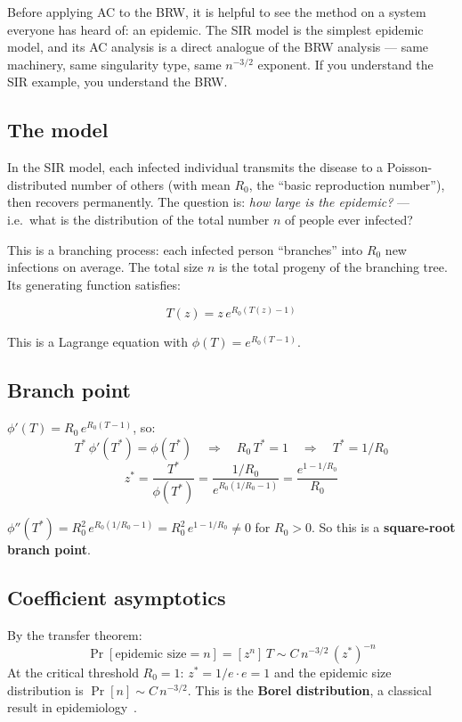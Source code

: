 \documentclass[11pt,a4paper]{article}
\theoremstyle{definition}
\begin{document}
Before applying AC to the BRW, it is helpful to see the method on
a system everyone has heard of: an epidemic. The SIR model is the
simplest epidemic model, and its AC analysis is a direct analogue of
the BRW analysis --- same machinery, same singularity type, same
$n^{-3/2}$ exponent. If you understand the SIR example, you understand
the BRW.

\subsection{The model}

In the SIR model, each infected individual transmits the disease to
a Poisson-distributed number of others (with mean $R_0$, the ``basic
reproduction number''), then recovers permanently. The question is:
\emph{how large is the epidemic?} --- i.e.\ what is the distribution
of the total number $n$ of people ever infected?

This is a branching process: each infected person ``branches'' into
$R_0$ new infections on average. The total size $n$ is the total
progeny of the branching tree. Its generating function satisfies:

\begin{equation}
T(z) = z\, e^{R_0(T(z) - 1)}
\label{eq:sir_lagrange}
\end{equation}

This is a Lagrange equation with $\phi(T) = e^{R_0(T-1)}$.

\subsection{Branch point}

$\phi'(T) = R_0\, e^{R_0(T-1)}$, so:
\[
T^*\, \phi'(T^*) = \phi(T^*)
\quad\Longrightarrow\quad
R_0\, T^* = 1
\quad\Longrightarrow\quad
T^* = 1/R_0
\]
\[
z^* = \frac{T^*}{\phi(T^*)} = \frac{1/R_0}{e^{R_0(1/R_0 - 1)}}
= \frac{e^{1 - 1/R_0}}{R_0}
\]

$\phi''(T^*) = R_0^2\, e^{R_0(1/R_0-1)} = R_0^2\, e^{1-1/R_0} \neq 0$ for
$R_0 > 0$. So this is a \textbf{square-root branch point}.

\subsection{Coefficient asymptotics}

By the transfer theorem:
\[
\Pr[\text{epidemic size} = n] = [z^n]\,T \sim C\, n^{-3/2}\, (z^*)^{-n}
\]
At the critical threshold $R_0 = 1$: $z^* = 1/e \cdot e = 1$ and the
epidemic size distribution is $\Pr[n] \sim C\, n^{-3/2}$. This is the
\textbf{Borel distribution}, a classical result in
epidemiology~\cite{flajolet2009}.
\end{document}
